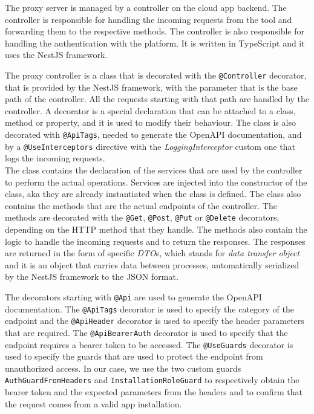 The proxy server is managed by a controller on the cloud app backend. The controller is responsible for handling the incoming requests from the tool and forwarding them to the respective methods. The controller is also responsible for handling the authentication with the platform. It is written in TypeScript and it uses the NestJS framework.

The proxy controller is a class that is decorated with the \texttt{@Controller} decorator, that is provided by the NestJS framework, with the parameter that is the base path of the controller. All the requests starting with that path are handled by the controller. A decorator is a special declaration that can be attached to a class, method or property, and it is used to modify their behaviour. The class is also decorated with \texttt{@ApiTags}, needed to generate the OpenAPI documentation, and by a \texttt{@UseInterceptors} directive with the \textit{LoggingInterceptor} custom one that logs the incoming requests. \\
The class contains the declaration of the services that are used by the controller to perform the actual operations. Services are injected into the constructor of the class, aka they are already instantiated when the class is defined. The class also contains the methods that are the actual endpoints of the controller. The methods are decorated with the \texttt{@Get}, \texttt{@Post}, \texttt{@Put} or \texttt{@Delete} decorators, depending on the HTTP method that they handle. The methods also contain the logic to handle the incoming requests and to return the responses. The responses are returned in the form of specific \textit{DTO}s, which stands for \textit{data transfer object} and it is an object that carries data between processes, automatically serialized by the NestJS framework to the JSON format.

The decorators starting with \texttt{@Api} are used to generate the OpenAPI documentation. The \texttt{@ApiTags} decorator is used to specify the category of the endpoint and the \texttt{@ApiHeader} decorator is used to specify the header parameters that are required. The \texttt{@ApiBearerAuth} decorator is used to specify that the endpoint requires a bearer token to be accessed. The \texttt{@UseGuards} decorator is used to specify the guards that are used to protect the endpoint from unauthorized access. In our case, we use the two custom guards \texttt{AuthGuardFromHeaders} and \texttt{InstallationRoleGuard} to respectively obtain the bearer token and the expected parameters from the headers and to confirm that the request comes from a valid app installation.

